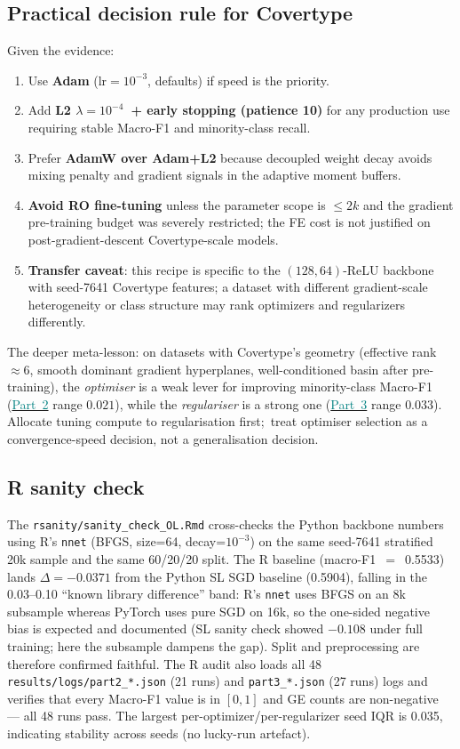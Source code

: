 \documentclass[conference]{IEEEtran}
\newcommand{\partref}[2]{\hyperref[#2]{\textcolor{teal}{Part~#1}}}
\begin{document}
\subsection{Practical decision rule for Covertype}\label{sec:disc:rule}
Given the evidence:
\begin{enumerate}[leftmargin=*]
\item Use \textbf{Adam} (lr$=10^{-3}$, defaults) if speed is the priority.
\item Add \textbf{L2 $\lambda{=}10^{-4}$~+ early stopping (patience 10)} for any
production use requiring stable Macro-F1 and minority-class recall.
\item Prefer \textbf{AdamW over Adam+L2} because decoupled weight decay
\cite{loshchilov2019adamw} avoids mixing penalty and gradient signals in the
adaptive moment buffers.
\item \textbf{Avoid RO fine-tuning} unless the parameter scope is $\leq 2k$
and the gradient pre-training budget was severely restricted;
the FE cost is not justified on post-gradient-descent Covertype-scale models.
\item \textbf{Transfer caveat}: this recipe is specific to the
$(128,64)$-ReLU backbone with seed-7641 Covertype features; a dataset with
different gradient-scale heterogeneity or class structure may rank
optimizers and regularizers differently.
\end{enumerate}
\noindent
The deeper meta-lesson: on datasets with Covertype's geometry
(effective rank $\approx 6$, smooth dominant gradient hyperplanes,
well-conditioned basin after pre-training), the \emph{optimiser}
is a weak lever for improving minority-class Macro-F1
(\partref{2}{sec:p2} range $0.021$), while the \emph{regulariser} is a strong one
(\partref{3}{sec:p3} range $0.033$).
Allocate tuning compute to regularisation first;\, treat optimiser
selection as a convergence-speed decision, not a generalisation decision.

\subsection{R sanity check}\label{sec:disc:rsanity}
The \texttt{rsanity/sanity\_check\_OL.Rmd} cross-checks the Python backbone
numbers using R's \texttt{nnet} (BFGS, size=64, decay=$10^{-3}$) on the
same seed-7641 stratified 20k sample and the same 60/20/20 split.
The R baseline (macro-F1~$=$~0.5533) lands $\Delta{=}{-}0.0371$ from the
Python SL SGD baseline (0.5904), falling in the 0.03--0.10
``known library difference'' band: R's \texttt{nnet} uses BFGS on an 8k
subsample whereas PyTorch uses pure SGD on 16k, so the one-sided negative
bias is expected and documented (SL sanity check showed $-0.108$ under full
training; here the subsample dampens the gap). Split and preprocessing are
therefore confirmed faithful.
The R audit also loads all 48 \texttt{results/logs/part2\_*.json} (21 runs)
and \texttt{part3\_*.json} (27 runs) logs and verifies that every Macro-F1
value is in $[0,1]$ and GE counts are non-negative --- all 48 runs pass.
The largest per-optimizer/per-regularizer seed IQR is 0.035, indicating
stability across seeds (no lucky-run artefact).
\end{document}
